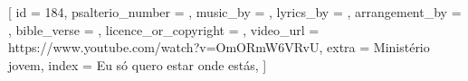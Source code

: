 [
    id                     = {184},
    psalterio_number       = {},
    music_by               = {},
    lyrics_by              = {},
    arrangement_by         = {},
    bible_verse            = {},
    licence_or_copyright   = {},
    video_url              = {https://www.youtube.com/watch?v=OmORmW6VRvU},
    extra                  = {Ministério jovem},
    index                  = {Eu só quero estar onde estás},
]


\beginverse


\endverse


\beginchorus


\endchorus


\beginverse


\endverse



\endsong
